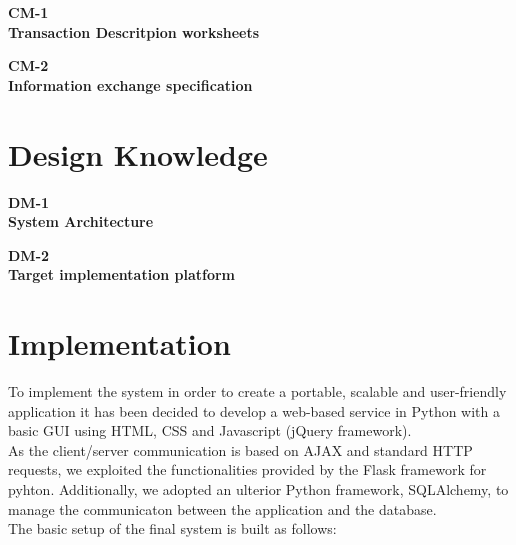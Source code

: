 \documentclass[11pt]{article} %
\def\worksheet#1#2{%
  \begin{center}
  {\large\bf #1} \\
  {\normalsize\bf #2} \\[12pt]
  \begin{footnotesize}
  
  \end{footnotesize}
  \end{center}  
  \vfill}
\begin{document}
\worksheet{CM-1}{Transaction Descritpion worksheets}

\worksheet{CM-2}{Information exchange specification}

\clearpage
\section{Design Knowledge}

\worksheet{DM-1}{System Architecture}

\worksheet{DM-2}{Target implementation platform}

\newpage
\section{Implementation}
To implement the system in order to create a portable, scalable and user-friendly application it has been decided to develop a web-based service in Python with a basic GUI using HTML, CSS and Javascript (jQuery framework).\\
\indent As the client/server communication is based on AJAX and standard HTTP requests, we exploited the functionalities provided by the Flask framework for pyhton. Additionally, we adopted an ulterior Python framework, SQLAlchemy, to manage the communicaton between the application and the database.\\
\indent The basic setup of the final system is built as follows:
\end{document}
